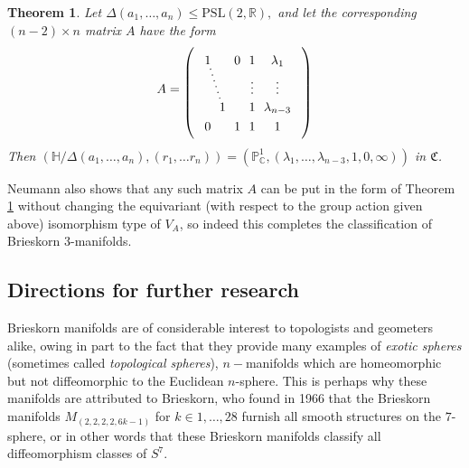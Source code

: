 \documentclass{article}
\newtheorem{theorem}{Theorem}[section]
\begin{document}
\begin{theorem}
\label{5.2}
Let $\Delta(a_1, \dots, a_n) \leq \mathrm{PSL}(2, \mathbb{R}),$ and let the corresponding $(n-2) \times n$ matrix $A$ have the form
\[A = \begin{tikzpicture}[baseline=(current bounding box.center)]
\matrix (m) [matrix of math nodes,nodes in empty cells,right delimiter={)},left delimiter={(} ]{
1  &  & 0  & 1 & \lambda_1  \\
  & & & \vdots & \vdots \\
 & 1  & & 1 & \lambda_{n-3}    \\
0  & & 1 & 1 & 1 \\
} ;
\draw[loosely dotted, thick] (m-1-1)-- (m-3-2);
\end{tikzpicture}\]
Then $(\mathbb{H}/\Delta(a_1, \dots, a_n),(r_1, \dots r_n)) = (\mathbb{P}_\mathbb{C}^1, (\lambda_1, \dots, \lambda_{n-3}, 1, 0, \infty))$ in $\mathfrak{C}$.
\end{theorem}
Neumann also shows that any such matrix $A$ can be put in the form of Theorem \ref{5.2} without changing the equivariant (with respect to the group action given above) isomorphism type of $V_A$, so indeed this completes the classification of Brieskorn $3$-manifolds.

\subsection{Directions for further research}

Brieskorn manifolds are of considerable interest to topologists and geometers alike, owing in part to the fact that they provide many examples of \textit{exotic spheres} (sometimes called \textit{topological spheres}), $n-$manifolds which are homeomorphic but not diffeomorphic to the Euclidean $n$-sphere. This is perhaps why these manifolds are attributed to Brieskorn, who found in 1966 that the Brieskorn manifolds $M_{(2,2,2,2,6k-1)}$ for $k \in 1, \dots, 28$ furnish all smooth structures on the $7$-sphere, or in other words that these Brieskorn manifolds classify all diffeomorphism classes of $S^7$. \cite{brieskorn_1966}
\end{document}
